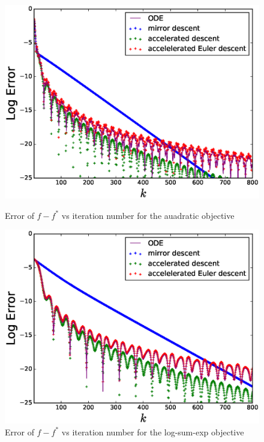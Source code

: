 \begin{figure}[!htb]
  \includegraphics[width=1\linewidth]{Experiments/amd-quadratic-logerror.eps}
\caption{Error of $f-f^*$ vs iteration number for the auadratic objective}
\label{fig: quaderr}
\endminipage\hfill
{}%
 \includegraphics[width=1\linewidth]{Experiments/amd-logsumexp-logerror.eps}
\caption{Error of $f-f^*$ vs iteration number for the log-sum-exp objective}
\label{fig: logsumexperr}
\endminipage
\end{figure}

